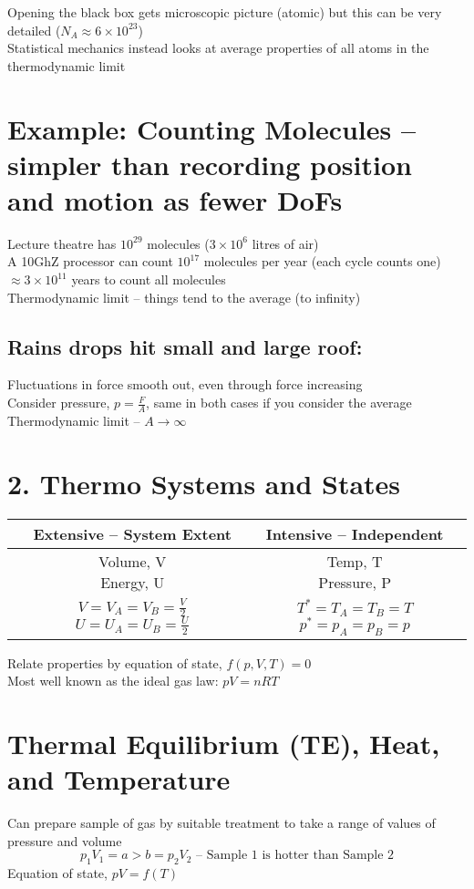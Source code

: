 \documentclass[a4paper, 11pt, fleqn, normalem]{report}
\newcommand\answerbox{%
    \fbox{\rule{1in}{0pt}\rule[-0.5ex]{0pt}{3ex}}}
\newcommand\halfbox{%
    \fbox{\rule{0.45in}{0pt}\rule[-0.25ex]{0pt}{3ex}}}
\begin{document}
Opening the black box gets microscopic picture (atomic) but this can be very detailed ($N_A \approx 6 \times 10^23$) \\
Statistical mechanics instead looks at average properties of all atoms in the thermodynamic limit

\section{Example: Counting Molecules -- simpler than recording position and motion  as fewer DoFs}
Lecture theatre has $10^29$ molecules ($3 \times 10^6$ litres of air) \\
A 10GhZ processor can count $10^17$ molecules per year (each cycle counts one) $\approx 3 \times 10^11$ years to count all molecules \\
Thermodynamic limit -- things tend to the average (to infinity)

\subsection{Rains drops hit small and large roof:}
Fluctuations in force smooth out, even through force increasing \\
Consider pressure, $p = \frac{F}{A}$, same in both cases if you consider the average \\
Thermodynamic limit -- $A \to \infty$

\section{2. Thermo Systems and States}
\begin{tabular}{c|c|c}
     & Extensive -- System Extent & Intensive -- Independent \\
     \hline
     \answerbox & \shortstack{Volume, V \\ Energy, U} & \shortstack{Temp, T \\ Pressure, P} \\
     \hline
     \halfbox \halfbox & \shortstack{$V = V_A = V_B = \frac{V}{2}$ \\ $U = U_A = U_B = \frac{U}{2}$} & \shortstack{$T^* = T_A = T_B = T$ \\ $p^* = p_A = p_B = p$}
\end{tabular}
Relate properties by equation of state, $f(p,V,T) = 0$ \\
Most well known as the ideal gas law: $pV = nRT$

\section{Thermal Equilibrium (TE), Heat, and Temperature}
Can prepare sample of gas by suitable treatment to take a range of values of pressure and volume
\begin{equation*}
    p_{1}V_{1} = a > b = p_{2}V_{2} \text{ -- Sample 1 is hotter than Sample 2}
\end{equation*}
Equation of state, $pV = f(T)$
\end{document}
